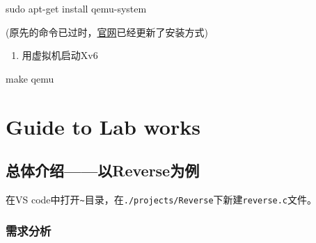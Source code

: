 \documentclass{article}
\newenvironment{Shaded}{}{}
\newcommand{\FunctionTok}[1]{\textcolor[rgb]{0.02,0.16,0.49}{#1}}
\newcommand{\NormalTok}[1]{#1}
\begin{document}
\begin{Shaded}
  \begin{Highlighting}[]
    \FunctionTok{sudo}\NormalTok{ apt{-}get install qemu{-}system}
  \end{Highlighting}
\end{Shaded}

(原先的命令已过时，\href{https://www.qemu.org/download/\#linux}{官网}已经更新了安装方式)

\begin{enumerate}
  \def\labelenumi{\arabic{enumi}.}
  \item
        用虚拟机启动Xv6
\end{enumerate}

\begin{Shaded}
  \begin{Highlighting}[]
    \FunctionTok{make}\NormalTok{ qemu}
  \end{Highlighting}
\end{Shaded}

\section{Guide to Lab works}\label{guide-to-lab-works}

\subsection{总体介绍------以Reverse为例}\label{ux603bux4f53ux4ecbux7ecd------ux4ee5reverseux4e3aux4f8b}

在VS
code中打开\texttt{\textasciitilde{}}目录，在\texttt{./projects/Reverse}下新建\texttt{reverse.c}文件。

\subsubsection{需求分析}\label{ux9700ux6c42ux5206ux6790}
\end{document}

